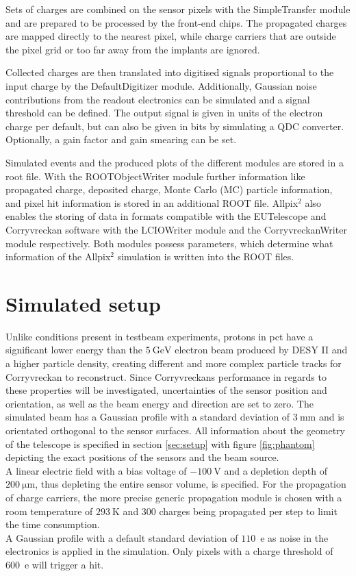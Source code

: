 Sets of charges are combined on the sensor pixels with the SimpleTransfer module and are prepared  to be processed by the front-end chips. The
propagated charges are mapped directly to the nearest pixel, while charge carriers that are outside the pixel grid or too far away from the implants are ignored.

Collected charges are then translated into digitised signals proportional to the input charge by the DefaultDigitizer module. Additionally, Gaussian noise contributions
from the readout electronics can be simulated and a signal threshold can be defined. The output signal is given in units of the electron charge per default, but
can also be given in bits by simulating a QDC converter. Optionally, a gain factor and gain smearing can be set.

Simulated events and the produced plots of the different modules are stored in a root file. With the ROOTObjectWriter module further information like propagated charge,
deposited charge, Monte Carlo (MC) particle information, and pixel hit information is stored in an additional ROOT file. Allpix$^2$ also enables the storing of
data in formats compatible with the EUTelescope and Corryvreckan software with the LCIOWriter module and the CorryvreckanWriter module respectively. Both modules possess parameters, which
determine what information of the Allpix$^2$ simulation is written into the ROOT files.

\section{Simulated setup}
Unlike conditions present in testbeam experiments, protons in pct have a significant lower energy than the $\SI{5}{\giga\eV}$
electron beam produced by DESY II and a higher particle density, creating different and more complex particle tracks for
Corryvreckan to reconstruct. Since Corryvreckans performance in regards to these properties will be investigated, uncertainties
of the sensor position and orientation, as well as the beam energy and direction are set to zero. The simulated
beam has a Gaussian profile with a standard deviation of $\SI{3}{\milli\meter}$ and is orientated orthogonal to the sensor
surfaces. All information about the geometry of the telescope is specified in section \ref{sec:setup} with
figure \ref{fig:phantom} depicting the exact positions of the sensors and the beam source. \\ %
A linear electric field with a bias voltage of $\SI{-100}{\volt}$ and a depletion depth of $\SI{200}{\micro\meter}$,
thus depleting the entire sensor volume, is specified. For the propagation of charge carriers, the more precise generic propagation
module is chosen with a room temperature of $\SI{293}{\kelvin}$ and 300 charges being propagated per step to limit the time consumption.\\
A Gaussian profile with a default standard deviation of $110$\, e as noise in the electronics is applied in the simulation.
Only pixels with a charge threshold of $600$\, e will trigger a hit.

